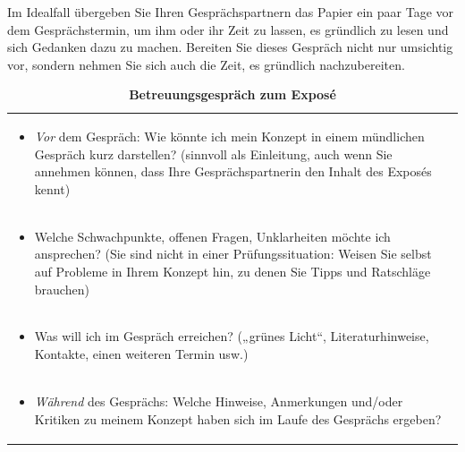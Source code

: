 \documentclass[]{book}
\providecommand{\tightlist}{%
  \setlength{\itemsep}{0pt}\setlength{\parskip}{0pt}}
\theoremstyle{definition}
\theoremstyle{definition}
\theoremstyle{definition}
\theoremstyle{remark}
\begin{document}
Im Idealfall übergeben Sie Ihren Gesprächspartnern das Papier ein paar
Tage vor dem Gesprächstermin, um ihm oder ihr Zeit zu lassen, es
gründlich zu lesen und sich Gedanken dazu zu machen. Bereiten Sie dieses
Gespräch nicht nur umsichtig vor, sondern nehmen Sie sich auch die Zeit,
es gründlich nachzubereiten.

\begin{longtable}[]{@{}l@{}}
\caption{\textbf{\label{tab:betreuung} Betreuungsgespräch zum
Exposé}}\tabularnewline
\toprule
\begin{minipage}[t]{0.97\columnwidth}\raggedright\strut
\begin{itemize}
\tightlist
\item
  \emph{Vor} dem Gespräch: Wie könnte ich mein Konzept in einem
  mündlichen Gespräch kurz darstellen? (sinnvoll als Einleitung, auch
  wenn Sie annehmen können, dass Ihre Gesprächspartnerin den Inhalt des
  Exposés kennt)\vspace{-6mm}
\end{itemize}\strut
\end{minipage}\tabularnewline
\begin{minipage}[t]{0.97\columnwidth}\raggedright\strut
\begin{itemize}
\tightlist
\item
  Welche Schwachpunkte, offenen Fragen, Unklarheiten möchte ich
  ansprechen? (Sie sind nicht in einer Prüfungssituation: Weisen Sie
  selbst auf Probleme in Ihrem Konzept hin, zu denen Sie Tipps und
  Ratschläge brauchen)\vspace{-6mm}
\end{itemize}\strut
\end{minipage}\tabularnewline
\begin{minipage}[t]{0.97\columnwidth}\raggedright\strut
\begin{itemize}
\tightlist
\item
  Was will ich im Gespräch erreichen? („grünes Licht``,
  Literaturhinweise, Kontakte, einen weiteren Termin usw.)\vspace{-6mm}
\end{itemize}\strut
\end{minipage}\tabularnewline
\begin{minipage}[t]{0.97\columnwidth}\raggedright\strut
\begin{itemize}
\tightlist
\item
  \emph{Während} des Gesprächs: Welche Hinweise, Anmerkungen und/oder
  Kritiken zu meinem Konzept haben sich im Laufe des Gesprächs
  ergeben?\vspace{-6mm}

\end{itemize}
\end{minipage}
\end{longtable}
\end{document}
